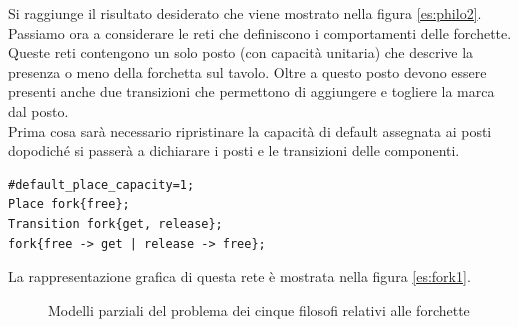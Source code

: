 \documentclass[italian,12pt]{book}
\begin{document}
Si raggiunge il risultato desiderato che viene mostrato nella figura \ref{es:philo2}.\\

Passiamo ora a considerare le reti che definiscono i comportamenti delle forchette. \\
Queste reti contengono un solo posto (con capacità unitaria) che descrive la presenza 
o meno della forchetta sul tavolo. Oltre a questo posto devono essere presenti anche due 
transizioni che permettono di aggiungere e togliere la marca dal posto. \\
Prima cosa sarà necessario ripristinare la capacità di default assegnata ai posti dopodiché si
passerà a dichiarare i posti e le transizioni delle componenti.

\begin{verbatim}#default_place_capacity=1;
Place fork{free};
Transition fork{get, release};
fork{free -> get | release -> free};
\end{verbatim}

La rappresentazione grafica di questa rete è mostrata nella figura \ref{es:fork1}.\\

\begin{figure}[htbp] 
\centering%
\hspace{1cm}\vspace{1cm}%
\hspace{1cm}\vspace{1cm}%
\caption{Modelli parziali del problema dei cinque filosofi relativi alle forchette\label{fig:modelli_parziali_fork}} 
\end{figure} 
\end{document}
